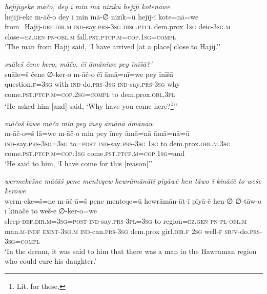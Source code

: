 \ea \label{ŽP.102}
\textit{hejījīyeke māčo, dey ī min īnā nizīkū hejījī kotenāwe} \\ 
\gll hejījī-eke m-āč-o dey ī min īnā-∅ nizīk=ū hejīj-ī kote=nā=we \\ 
 from\_Hajij\textsc{-def}\textsc{.dir}\textsc{.m} \textsc{ind-}say\textsc{.prs}\textsc{-3sg} \textsc{disc.ptcl} dem.prox \textsc{1sg} deic\textsc{-3sg}\textsc{.m} close\textsc{\textsc{=ez.gen}} \textsc{pn}\textsc{-obl}\textsc{.m} fall\textsc{.pst}\textsc{.ptcp}\textsc{.m}\textsc{=cop}\textsc{.\textsc{1sg}}\textsc{=compl} \\ 
\glt `The man from Hajij said, ‘I have arrived [at a place] close to Hajij.’'
\z 
 
\ea \label{ŽP.135}
\textit{suāleš čene kero, māčo, čī āmānīwe pey īnīšā?’} \\ 
\gll suāle=š čene ∅-ker-o m-āč-o čī āmā=nī=we pey īnīšā \\ 
 question\textsc{.f}\textsc{=3sg} with \textsc{ind-}do\textsc{.prs}\textsc{-3sg} \textsc{ind-}say\textsc{.prs}\textsc{-3sg} why come\textsc{.pst}\textsc{.ptcp}\textsc{.m}\textsc{=cop}\textsc{.\textsc{2sg}}\textsc{=compl} to dem.prox\textsc{.obl}\textsc{.3pl} \\ 
\glt `He asked him [and] said, ‘Why have you come here?\footnote{Lit. for these.}’'
\z 
 
\ea \label{ŽP.138}
\textit{māčoš lāwe māčo min pey īney āmānā āmānāw} \\ 
\gll m-āč-o=š lā=we m-āč-o min pey īney āmā=nā āmā=nā=ū \\ 
 \textsc{ind-}say\textsc{.prs}\textsc{-3sg}\textsc{=3sg} to\textsc{=\textsc{post}} \textsc{ind-}say\textsc{.prs}\textsc{-3sg} \textsc{1sg} to dem.prox\textsc{.obl}\textsc{.m}\textsc{.3sg} come\textsc{.pst}\textsc{.ptcp}\textsc{.m}\textsc{=cop}\textsc{.\textsc{1sg}} come\textsc{.pst}\textsc{.ptcp}\textsc{.m}\textsc{=cop}\textsc{.\textsc{1sg}}=and \\ 
\glt `He said to him, ‘I have come for this [reason]’'
\z 
 
\ea \label{ŽP.154}
\textit{wermekešne māčāš pene menteqew hewrāmānātī pīyāwē hen tāwo ī kināčē to weše kerowe} \\ 
\gll werm-eke=š=ne m-āč-ā=š pene menteqe=ū hewrāmān-āt-ī pīyā-ē hen-∅ ∅-tāw-o ī kināčē to weš-e ∅-ker-o=we \\ 
 sleep\textsc{-def}\textsc{.dir}\textsc{.m}\textsc{=3sg}\textsc{=\textsc{post}} \textsc{ind-}say\textsc{.prs}\textsc{-3pl}\textsc{=3sg} to region=\textsc{ez.gen} \textsc{pn}\textsc{\textsc{-pl}}\textsc{-obl}\textsc{.m} man\textsc{.m}\textsc{-indf} \textsc{exist}\textsc{-3sg}\textsc{.m} \textsc{ind-}can\textsc{.prs}\textsc{-3sg} dem.prox girl\textsc{.dir}\textsc{.f} \textsc{2sg} well\textsc{-f} \textsc{sbjv-}do\textsc{.prs}\textsc{-3sg}\textsc{=compl} \\ 
\glt `In the dream, it was said to him that there was a man in the Hawraman region who could cure his daughter.'
\z 
 
